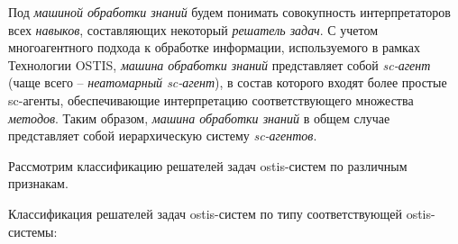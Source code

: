 Под \textit{машиной обработки знаний} будем понимать совокупность интерпретаторов всех \textit{навыков}, составляющих некоторый \textit{решатель задач}. С учетом многоагентного подхода к обработке информации, используемого в рамках Технологии OSTIS, \textit{машина обработки знаний} представляет собой \textit{sc-агент} (чаще всего -- \textit{неатомарный sc-агент}), в состав которого входят более простые sc-агенты, обеспечивающие интерпретацию соответствующего множества \textit{методов}. Таким образом, \textit{машина обработки знаний} в общем случае представляет собой иерархическую систему \textit{sc-агентов}.

\begin{SCn}
\end{SCn}

Рассмотрим классификацию решателей задач ostis-систем по различным признакам.

Классификация решателей задач ostis-систем по типу соответствующей ostis-системы:

